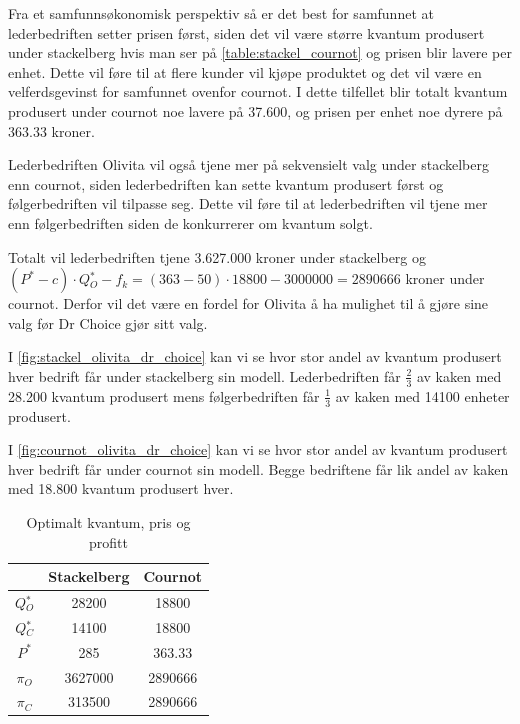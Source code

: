 \documentclass[
  12pt,
  a4paper,
  DIV=11,
  numbers=noendperiod]{scrartcl}
\begin{document}
Fra et samfunnsøkonomisk perspektiv så er det best for samfunnet at
lederbedriften setter prisen først, siden det vil være større kvantum
produsert under stackelberg hvis man ser på
\autoref{table:stackel_cournot} og prisen blir lavere per enhet. Dette
vil føre til at flere kunder vil kjøpe produktet og det vil være en
velferdsgevinst for samfunnet ovenfor cournot. I dette tilfellet blir
totalt kvantum produsert under cournot noe lavere på 37.600, og prisen
per enhet noe dyrere på 363.33 kroner.

Lederbedriften Olivita vil også tjene mer på sekvensielt valg under
stackelberg enn cournot, siden lederbedriften kan sette kvantum
produsert først og følgerbedriften vil tilpasse seg. Dette vil føre til
at lederbedriften vil tjene mer enn følgerbedriften siden de konkurrerer
om kvantum solgt.

Totalt vil lederbedriften tjene 3.627.000 kroner under stackelberg og
\((P^* -c) \cdot Q{_O^*} -f_k =(363 -50) \cdot18800 - 3000000 = 2890666\)
kroner under cournot. Derfor vil det være en fordel for Olivita å ha
mulighet til å gjøre sine valg før Dr Choice gjør sitt valg.

I \autoref{fig:stackel_olivita_dr_choice} kan vi se hvor stor andel av
kvantum produsert hver bedrift får under stackelberg sin modell.
Lederbedriften får \(\frac{2}{3}\) av kaken med 28.200 kvantum produsert
mens følgerbedriften får \(\frac{1}{3}\) av kaken med 14100 enheter
produsert.

I \autoref{fig:cournot_olivita_dr_choice} kan vi se hvor stor andel av
kvantum produsert hver bedrift får under cournot sin modell. Begge
bedriftene får lik andel av kaken med 18.800 kvantum produsert hver.

\begin{table}
\centering
\begin{tabular}{|c|c|c|}
\hline
\rowcolor{winered}
 & Stackelberg & Cournot \\ \hline
 \rowcolor{wesgrey}
$Q{_O^*}$ & 28200 & 18800 \\ \hline
 \rowcolor{wesgrey}
$Q{_C^*}$ & 14100 & 18800 \\ \hline
 \rowcolor{wesgrey}
$P^*$ & 285 & 363.33 \\ \hline
 \rowcolor{wesgrey}
$\pi_O$ & 3627000 & 2890666 \\ \hline
 \rowcolor{wesgrey}
$\pi_C$ & 313500 & 2890666 \\ \hline
\end{tabular}
\caption{Optimalt kvantum, pris og profitt}
\label{table:stackel_cournot}
\end{table}
\end{document}
